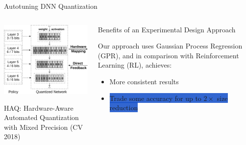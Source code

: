\documentclass[10pt, compress, aspectratio=169, xcolor={table,usenames,dvipsnames}]{beamer}
\begin{document}
\begin{frame}[label={sec:org61355ae}]{Autotuning DNN Quantization}
\begin{columns}
\begin{column}{0.42\columnwidth}
\begin{center}
\includegraphics[width=\columnwidth]{../../../img/haq_quantization.pdf}
\end{center}

\begin{center}
\scriptsize{HAQ: Hardware-Aware Automated Quantization\\with Mixed Precision (CV 2018)}
\end{center}
\end{column}
\begin{column}{0.58\columnwidth}
\begin{block}{Benefits of an Experimental Design Approach}
\vspace{0.8em}

Our approach uses Gaussian Process  Regression (GPR), and in comparison with
Reinforcement Learning (RL), achieves:

\begin{itemize}
\item More \alert{consistent results}
\item \colorbox{Highlight}{Trade some accuracy for \alert{up to $2\times$ size reduction}}
\end{itemize}
\end{block}
\end{column}
\end{columns}
\end{frame}
\end{document}
